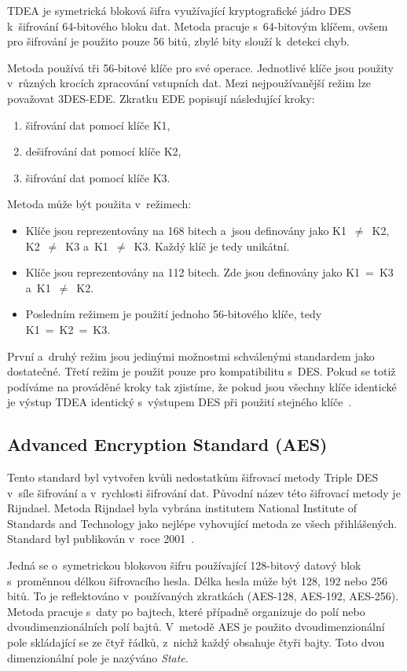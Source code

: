 TDEA je symetrická bloková šifra využívající kryptografické jádro DES k~šifrování 64-bitového bloku
dat. Metoda pracuje s~64-bitovým klíčem, ovšem pro šifrování je použito pouze 56 bitů, zbylé bity
slouží k~detekci chyb. 

Metoda používá tři 56-bitové klíče pro své operace. Jednotlivé klíče jsou použity v~různých krocích
zpracování vstupních dat. Mezi nejpoužívanější režim lze považovat 3DES-EDE. Zkratku EDE popisují
následující kroky:
\begin{enumerate}
    \item šifrování dat pomocí klíče K1,
    \item dešifrování dat pomocí klíče K2,
    \item šifrování dat pomocí klíče K3.
\end{enumerate}
Metoda může být použita v~režimech:
\begin{itemize}
    \item Klíče jsou reprezentovány na 168 bitech a~jsou definovány jako K1~$\neq$~K2, K2~$\neq$~K3
        a~K1~$\neq$~K3. Každý klíč je tedy unikátní.
    \item Klíče jsou reprezentovány na 112 bitech. Zde jsou definovány jako K1~=~K3 a~K1~$\neq$~K2.
    \item Posledním režimem je použití jednoho 56-bitového klíče, tedy K1~=~K2~=~K3.
\end{itemize}
První a~druhý režim jsou jedinými možnostmi schválenými standardem jako dostatečné. Třetí režim
je použit pouze pro kompatibilitu s~DES. Pokud se totiž podíváme na prováděné kroky tak zjistíme,
že pokud jsou všechny klíče identické je výstup TDEA identický s~výstupem DES při použití stejného
klíče~\cite{NIST:2012}.

\subsection{Advanced Encryption Standard (AES)}
    \label{ssec:AES}
Tento standard byl vytvořen kvůli nedostatkům šifrovací metody Triple DES v~síle šifrování a
v~rychlosti šifrování dat. Původní název této šifrovací metody je Rijndael. Metoda Rijndael byla
vybrána institutem National Institute of Standards and Technology jako nejlépe vyhovující metoda ze
všech přihlášených. Standard byl publikován v~roce 2001~\cite{NIST:2001}.

Jedná se o~symetrickou blokovou šifru používající 128-bitový datový blok s~proměnnou délkou
šifrovacího hesla. Délka hesla může být 128, 192 nebo 256 bitů. To je reflektováno v~používaných
zkratkách (AES-128, AES-192, AES-256). Metoda pracuje s~daty po bajtech, které případně organizuje
do polí nebo dvoudimenzionálních polí bajtů. V~metodě AES je použito dvoudimenzionální pole
skládající se ze čtyř řádků, z~nichž každý obsahuje čtyři bajty. Toto dvou dimenzionální pole je
nazýváno {\it State}.

